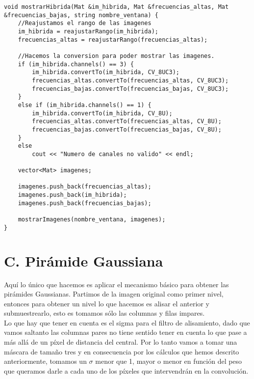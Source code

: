 \documentclass[10pt,a4paper]{article}
\begin{document}
\begin{lstlisting}
void mostrarHibrida(Mat &im_hibrida, Mat &frecuencias_altas, Mat &frecuencias_bajas, string nombre_ventana) {
	//Reajustamos el rango de las imagenes
	im_hibrida = reajustarRango(im_hibrida);
	frecuencias_altas = reajustarRango(frecuencias_altas);

	//Hacemos la conversion para poder mostrar las imagenes.
	if (im_hibrida.channels() == 3) {
		im_hibrida.convertTo(im_hibrida, CV_8UC3);
		frecuencias_altas.convertTo(frecuencias_altas, CV_8UC3);
		frecuencias_bajas.convertTo(frecuencias_bajas, CV_8UC3);
	}
	else if (im_hibrida.channels() == 1) {
		im_hibrida.convertTo(im_hibrida, CV_8U);
		frecuencias_altas.convertTo(frecuencias_altas, CV_8U);
		frecuencias_bajas.convertTo(frecuencias_bajas, CV_8U);
	}
	else
		cout << "Numero de canales no valido" << endl;

	vector<Mat> imagenes;

	imagenes.push_back(frecuencias_altas);
	imagenes.push_back(im_hibrida);
	imagenes.push_back(frecuencias_bajas);

	mostrarImagenes(nombre_ventana, imagenes);
}
\end{lstlisting}

\section*{C. Pirámide Gaussiana}

Aquí lo único que hacemos es aplicar el mecanismo básico para obtener las pirámides Gaussianas. Partimos de la imagen original como primer nivel, entonces para obtener un nivel lo que hacemos es alisar el anterior y submuestrearlo, esto es tomamos sólo las columnas y filas impares.\\

Lo que hay que tener en cuenta es el sigma para el filtro de alisamiento, dado que vamos saltanto las columnas pares no tiene sentido tener en cuenta lo que pase a más allá de un píxel de distancia del central. Por lo tanto vamos a tomar una máscara de tamaño tres y en consecuencia por los cálculos que hemos descrito anteriormente, tomamos un $\sigma$ menor que 1, mayor o menor en función del peso que queramos darle a cada uno de los píxeles que intervendrán en la convolución.\\
\end{document}
